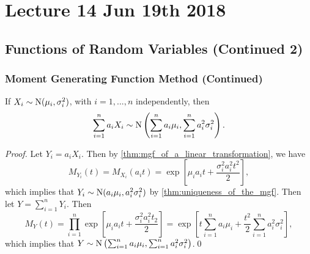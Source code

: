 \documentclass[notoc,notitlepage]{tufte-book}
\begin{document}



\chapter{Lecture 14 Jun 19th 2018}%
\label{chp:lecture_14_jun_19th_2018}

\section{Functions of Random Variables (Continued 2)}%
\label{sec:functions_of_random_variables_continued_2}

\subsection{Moment Generating Function Method (Continued)}%
\label{sub:moment_generating_function_method_continued}

\begin{thm}
\label{thm:gaussian_distribution}
If $X_i \sim \operatorname{N}( \mu_i, \sigma_i^2 )$, with $i = 1, ..., n$ independently, then
\begin{equation*}
  \sum_{i=1}^{n} a_i X_i \sim \operatorname{N}\left( \sum_{i=1}^{n} a_i \mu_i, \sum_{i=1}^{n} a_i^2 \sigma_i^2 \right).
\end{equation*}
\end{thm}

\begin{proof}
  Let $Y_i = a_i X_i$. Then by \cref{thm:mgf_of_a_linear_transformation}, we have
  \begin{equation*}
    M_{Y_i}(t) = M_{X_i}(a_i t) = \exp\left[ \mu_i a_i t + \frac{\sigma_i^2 a_i^2 t^2}{2} \right],
  \end{equation*}
  which implies that $Y_i \sim \operatorname{N}( a_i \mu_i, a_i^2 \sigma_i^2 )$ by \cref{thm:uniqueness_of_the_mgf}. Then let $Y = \sum_{i=1}^{n} Y_i$. Then
  \begin{equation*}
    M_Y(t) = \prod_{i=1}^{n} \exp\left[ \mu_i a_i t + \frac{\sigma_i^2 a_i^2 t_2}{2} \right] = \exp\left[ t \sum_{i=1}^{n} a_i \mu_i + \frac{t^2}{2} \sum_{i=1}^{n} a_i^2 \sigma_i^2 \right],
  \end{equation*}
  which implies that $Y \sim \operatorname{N}\left( \sum_{i=1}^{n} a_i \mu_i , \sum_{i=1}^{n} a_i^2 \sigma_i^2 \right)$.\qed
\end{proof}
\end{document}
